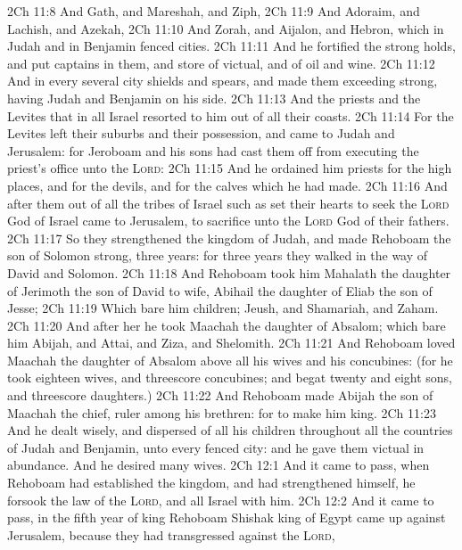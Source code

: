 \vs 2Ch 11:8 And Gath, and Mareshah, and Ziph,
\vs 2Ch 11:9 And Adoraim, and Lachish, and Azekah,
\vs 2Ch 11:10 And Zorah, and Aijalon, and Hebron, which  in Judah and in Benjamin fenced cities.
\vs 2Ch 11:11 And he fortified the strong holds, and put captains in them, and store of victual, and of oil and wine.
\vs 2Ch 11:12 And in every several city  shields and spears, and made them exceeding strong, having Judah and Benjamin on his side.
\vs 2Ch 11:13 And the priests and the Levites that  in all Israel resorted to him out of all their coasts.
\vs 2Ch 11:14 For the Levites left their suburbs and their possession, and came to Judah and Jerusalem: for Jeroboam and his sons had cast them off from executing the priest's office unto the \textsc{Lord}:
\vs 2Ch 11:15 And he ordained him priests for the high places, and for the devils, and for the calves which he had made.
\vs 2Ch 11:16 And after them out of all the tribes of Israel such as set their hearts to seek the \textsc{Lord} God of Israel came to Jerusalem, to sacrifice unto the \textsc{Lord} God of their fathers.
\vs 2Ch 11:17 So they strengthened the kingdom of Judah, and made Rehoboam the son of Solomon strong, three years: for three years they walked in the way of David and Solomon.
\vs 2Ch 11:18 And Rehoboam took him Mahalath the daughter of Jerimoth the son of David to wife,  Abihail the daughter of Eliab the son of Jesse;
\vs 2Ch 11:19 Which bare him children; Jeush, and Shamariah, and Zaham.
\vs 2Ch 11:20 And after her he took Maachah the daughter of Absalom; which bare him Abijah, and Attai, and Ziza, and Shelomith.
\vs 2Ch 11:21 And Rehoboam loved Maachah the daughter of Absalom above all his wives and his concubines: (for he took eighteen wives, and threescore concubines; and begat twenty and eight sons, and threescore daughters.)
\vs 2Ch 11:22 And Rehoboam made Abijah the son of Maachah the chief,  ruler among his brethren: for  to make him king.
\vs 2Ch 11:23 And he dealt wisely, and dispersed of all his children throughout all the countries of Judah and Benjamin, unto every fenced city: and he gave them victual in abundance. And he desired many wives.
\vs 2Ch 12:1 And it came to pass, when Rehoboam had established the kingdom, and had strengthened himself, he forsook the law of the \textsc{Lord}, and all Israel with him.
\vs 2Ch 12:2 And it came to pass,  in the fifth year of king Rehoboam Shishak king of Egypt came up against Jerusalem, because they had transgressed against the \textsc{Lord},
